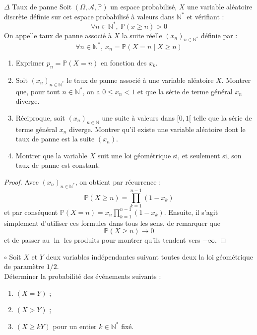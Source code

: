 \documentclass[french,a4paper]{article}
\renewcommand{\P}{\mathbb{P}}
\newcommand{\N}{\mathbb{N}}
\newcommand{\st}{^*}
\theoremstyle{plain}
\theoremstyle{definition}
\theoremstyle{remark}
\begin{document}
\begin{ex}[Moulin.44]{$\Delta$ Taux de panne}
	Soit $(\Omega,\mathcal{A},\P)$ un espace probabilisé, $X$ une variable aléatoire discrète définie sur cet espace probabilisé à valeurs dans $\N\st$ et vérifiant : $$\forall n\in\N\st,\ \P(x\geqslant n)>0$$ On appelle taux de panne associé à $X$ la suite réelle $(x_n)_{n\in\N\st}$ définie par : $$\forall n\in\N\st,\ x_n=\P(X=n\mid X\geqslant n)$$
	\begin{enumerate}
		\item Exprimer $p_n=\P(X=n)$ en fonction des $x_k$.
		\item Soit $(x_n)_{n\in\N\st}$ le taux de panne associé à une variable aléatoire $X$. Montrer que, pour tout $n\in\N\st$, on a $0\leqslant x_n<1$ et que la série de terme général $x_n$ diverge.
		\item Réciproque, soit $(x_n)_{n\in\N}$ une suite à valeurs dans $[0,1[$ telle que la série de terme général $x_n$ diverge. Montrer qu'il existe une variable aléatoire dont le taux de panne est la suite $(x_n)$.
		\item Montrer que la variable $X$ suit une loi géométrique si, et seulement si, son taux de panne est constant.
	\end{enumerate}
\end{ex}
\begin{proof}
	Avec $(x_n)_{n\in\N\st}$, on obtient par récurrence : $$\P(X\geqslant n)=\prod_{k=1}^{n-1}(1-x_k)$$ et par conséquent $\P(X=n)=x_n\prod_{k=1}^{n-1}(1-x_k)$. Ensuite, il s'agit simplement d'utiliser ces formules dans tous les sens, de remarquer que $$\P(X\geqslant n)\to 0$$ et de passer au $\ln$ les produits pour montrer qu'ils tendent vers $-\infty$.
\end{proof}

\begin{ex}[Moulin.45]{$\circ$}
	Soit $X$ et $Y$ deux variables indépendantes suivant toutes deux la loi géométrique de paramètre $1/2$. \\ Déterminer la probabilité des événements suivants :
	\begin{enumerate}
		\item $(X=Y)$ ;
		\item $(X>Y)$ ;
		\item $(X\geqslant kY)$ pour un entier $k\in\N\st$ fixé.
	\end{enumerate}
\end{ex}
\end{document}
